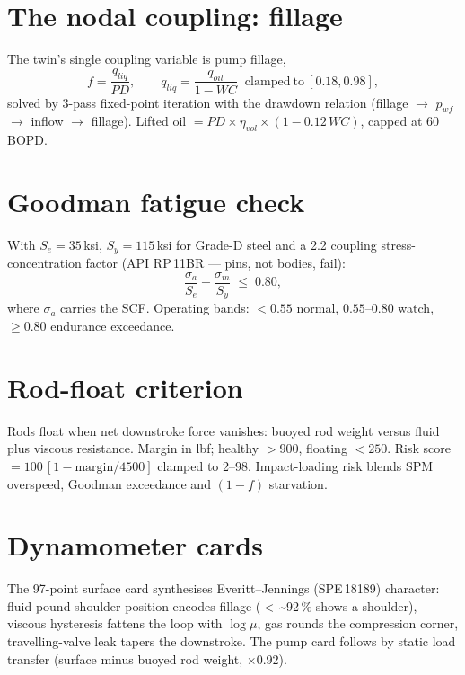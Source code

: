 \documentclass[12pt,a4paper]{report}
\begin{document}
\section{The nodal coupling: fillage}
The twin's single coupling variable is pump fillage,
\begin{equation}
f=\frac{q_{liq}}{PD},\qquad
q_{liq}=\frac{q_{oil}}{1-WC}\;\; \mathrm{clamped\ to\ }[0.18,0.98],
\label{eq:fillage}
\end{equation}
solved by 3-pass fixed-point iteration with the drawdown relation
(fillage $\rightarrow$ $p_{wf}$ $\rightarrow$ inflow $\rightarrow$ fillage).
Lifted oil $=PD\times\eta_{vol}\times(1-0.12\,WC)$, capped at 60\,BOPD.

\section{Goodman fatigue check}
With $S_e=35$\,ksi, $S_y=115$\,ksi for Grade-D steel and a 2.2 coupling
stress-concentration factor (API RP\,11BR --- pins, not bodies, fail):
\begin{equation}
\frac{\sigma_a}{S_e}+\frac{\sigma_m}{S_y}\;\le\;0.80,
\label{eq:goodman}
\end{equation}
where $\sigma_a$ carries the SCF. Operating bands: $<0.55$ normal,
$0.55$--$0.80$ watch, $\ge0.80$ endurance exceedance.

\section{Rod-float criterion}
Rods float when net downstroke force vanishes: buoyed rod weight versus fluid
plus viscous resistance. Margin in lbf; healthy $>900$, floating $<250$.
Risk score $=100\,[1-\mathrm{margin}/4500]$ clamped to 2--98. Impact-loading
risk blends SPM overspeed, Goodman exceedance and $(1-f)$ starvation.

\section{Dynamometer cards}
The 97-point surface card synthesises Everitt--Jennings (SPE\,18189)
character: fluid-pound shoulder position encodes fillage ($<$\,\textasciitilde92\,\%
shows a shoulder), viscous hysteresis fattens the loop with $\log\mu$, gas
rounds the compression corner, travelling-valve leak tapers the downstroke.
The pump card follows by static load transfer (surface minus buoyed rod
weight, $\times0.92$).
\end{document}
